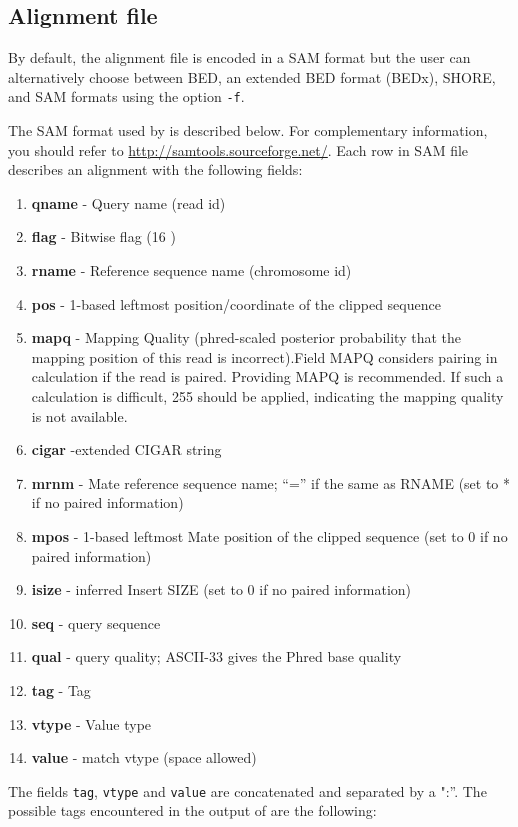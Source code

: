 \documentclass{article}
\begin{document}
\subsection{Alignment file}
\label{sec:samfile}
By default, the alignment file is encoded in a SAM format but the user
can alternatively choose between BED, an extended BED format (BEDx),
SHORE, and SAM formats using the option \texttt{-f}.

The SAM format used by \PALMapper{} is described below. For
complementary information, you should refer to
\url{http://samtools.sourceforge.net/}. Each row in SAM file describes
an alignment with the following fields:
\begin{enumerate}
\item \textbf{qname} - Query name (read id)
\item \textbf{flag} - Bitwise flag (16 )
\item \textbf{rname} - Reference sequence name (chromosome id) 
\item \textbf{pos} - 1-based leftmost position/coordinate of the
  clipped sequence 
\item \textbf{mapq} - Mapping Quality (phred-scaled posterior probability that the mapping
position of this read is incorrect).Field MAPQ considers pairing in
calculation if the read is paired. Providing MAPQ is recommended. If
such a calculation is difficult, 255 should be applied, indicating the
mapping quality is not available.
\item \textbf{cigar} -extended CIGAR string 
\item \textbf{mrnm} - Mate reference sequence name; “=” if the same as
  RNAME (set to * if no paired information)
\item \textbf{mpos} - 1-based leftmost Mate position of the clipped
  sequence (set to 0 if no paired information)
\item \textbf{isize} - inferred Insert SIZE (set to 0 if no paired information)
\item \textbf{seq} - query sequence
\item \textbf{qual} - query quality; ASCII-33 gives the Phred base quality
\item \textbf{tag} - Tag
\item \textbf{vtype} - Value type
\item \textbf{value} - match vtype (space allowed) 
\end{enumerate}

The fields \texttt{tag}, \texttt{vtype} and \texttt{value} are
concatenated and separated by a ":''. The possible tags
encountered in the output of \PALMapper{} are the following:\\
\end{document}
